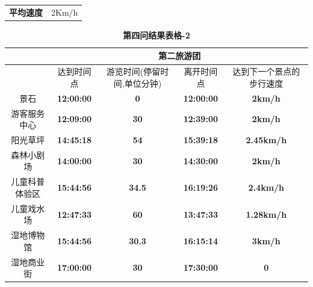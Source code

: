 \documentclass[hyperref,UTF8]{article}
\begin{document}
{\begin{table}[htbp]
\begin{tabular}{|c|c|c|c|c|}
    \hline
    \multicolumn{1}{|c|}{\multirow{2}[2]{*}{\textbf{平均速度}}} & \multicolumn{4}{c|}{\multirow{2}[2]{*}{ 2Km/h}} \bigstrut[t]\\
       & \multicolumn{4}{c|}{} \bigstrut[b]\\
    \hline
    \end{tabular}%
  \label{tab:addlabel+1}%
\end{table}%
\begin{table}[htbp]
  \centering
  \caption{\textbf{第四问结果表格-2}}
    \begin{tabular}{|c|c|c|c|c|}
    \hline
       & \multicolumn{4}{c|}{\textbf{第二旅游团}} \bigstrut\\
    \hline
       & \multicolumn{1}{p{4.055em}|}{达到时间点} & \multicolumn{1}{p{4.055em}|}{游览时间(停留时间,单位分钟)} & \multicolumn{1}{p{4.055em}|}{离开时间点} & \multicolumn{1}{p{4.055em}|}{达到下一个景点的步行速度} \bigstrut\\
    \hline
    \multicolumn{1}{|p{4.055em}|}{景石} & \textbf{12:00:00} & \textbf{0} & \textbf{12:00:00} & \multicolumn{1}{p{4.055em}|}{\textbf{2km/h}} \bigstrut\\
    \hline
    \multicolumn{1}{|p{4.055em}|}{游客服务中心} & \textbf{12:09:00} & \textbf{30} & \textbf{12:39:00} & \multicolumn{1}{p{4.055em}|}{\textbf{2km/h}} \bigstrut\\
    \hline
    \multicolumn{1}{|p{4.055em}|}{阳光草坪} & \textbf{14:45:18} & \textbf{54} & \textbf{15:39:18} & \multicolumn{1}{p{4.055em}|}{\textbf{2.45km/h}} \bigstrut\\
    \hline
    \multicolumn{1}{|p{4.055em}|}{森林小剧场} & \textbf{14:00:00} & \textbf{30} & \textbf{14:30:00} & \multicolumn{1}{p{4.055em}|}{\textbf{2km/h}} \bigstrut\\
    \hline
    \multicolumn{1}{|p{4.055em}|}{儿童科普体验区} & \textbf{15:44:56} & \textbf{34.5} & \textbf{16:19:26} & \multicolumn{1}{p{4.055em}|}{\textbf{2.4km/h}} \bigstrut\\
    \hline
    \multicolumn{1}{|p{4.055em}|}{儿童戏水场} & \textbf{12:47:33} & \textbf{60} & \textbf{13:47:33} & \multicolumn{1}{p{4.055em}|}{\textbf{1.28km/h}} \bigstrut\\
    \hline
    \multicolumn{1}{|p{4.055em}|}{湿地博物馆} & \textbf{15:44:56} & \textbf{30.3} & \textbf{16:15:14} & \multicolumn{1}{p{4.055em}|}{\textbf{3km/h}} \bigstrut\\
    \hline
    \multicolumn{1}{|p{4.055em}|}{湿地商业街} & \textbf{17:00:00} & \textbf{30} & \textbf{17:30:00} & \textbf{0} \bigstrut\\

\end{tabular}
\end{table}}
\end{document}
